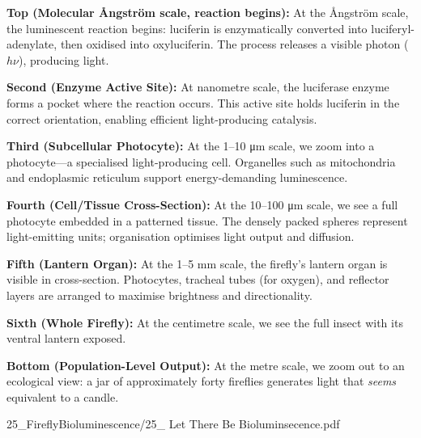 \begin{SideNotePage}{
  \textbf{Top (Molecular Ångström scale, reaction begins):}  
  At the Ångström scale, the luminescent reaction begins: luciferin is enzymatically converted into luciferyl-adenylate, then oxidised into oxyluciferin. The process releases a visible photon ($h\nu$), producing light. \par

  \textbf{Second (Enzyme Active Site):}  
  At nanometre scale, the luciferase enzyme forms a pocket where the reaction occurs. This active site holds luciferin in the correct orientation, enabling efficient light-producing catalysis. \par

  \textbf{Third (Subcellular Photocyte):}  
  At the 1–10 μm scale, we zoom into a photocyte—a specialised light-producing cell. Organelles such as mitochondria and endoplasmic reticulum support energy-demanding luminescence. \par

  \textbf{Fourth (Cell/Tissue Cross-Section):}  
  At the 10–100 μm scale, we see a full photocyte embedded in a patterned tissue. The densely packed spheres represent light-emitting units; organisation optimises light output and diffusion. \par

  \textbf{Fifth (Lantern Organ):}  
  At the 1–5 mm scale, the firefly's lantern organ is visible in cross-section. Photocytes, tracheal tubes (for oxygen), and reflector layers are arranged to maximise brightness and directionality. \par

  \textbf{Sixth (Whole Firefly):}  
  At the centimetre scale, we see the full insect with its ventral lantern exposed. \par

  \textbf{Bottom (Population-Level Output):}  
  At the metre scale, we zoom out to an ecological view: a jar of approximately forty fireflies generates light that \textit{seems} equivalent to a candle.\par

}{25_FireflyBioluminescence/25_ Let There Be Bioluminsecence.pdf}
\end{SideNotePage}
